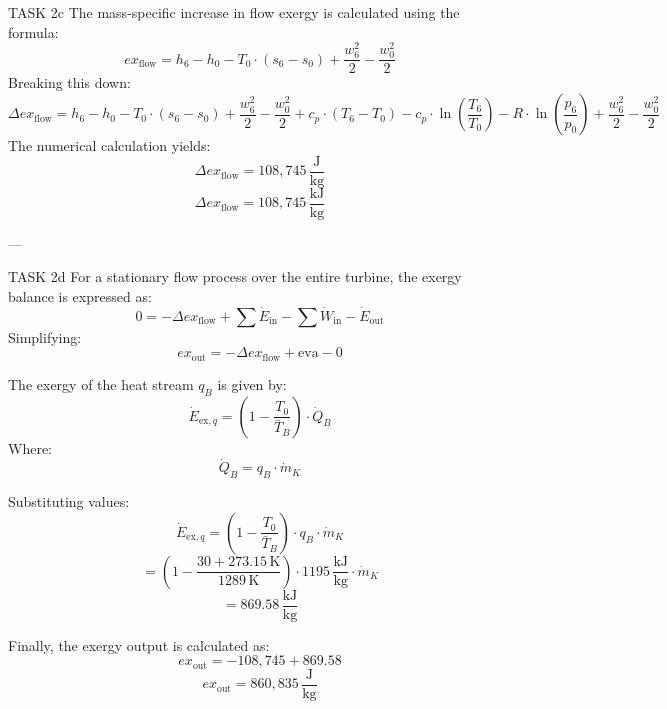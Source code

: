 TASK 2c  
The mass-specific increase in flow exergy is calculated using the formula:  
\[
ex_{\text{flow}} = h_6 - h_0 - T_0 \cdot (s_6 - s_0) + \frac{w_6^2}{2} - \frac{w_0^2}{2}
\]  
Breaking this down:  
\[
\Delta ex_{\text{flow}} = h_6 - h_0 - T_0 \cdot (s_6 - s_0) + \frac{w_6^2}{2} - \frac{w_0^2}{2} + c_p \cdot (T_6 - T_0) - c_p \cdot \ln\left(\frac{T_6}{T_0}\right) - R \cdot \ln\left(\frac{p_6}{p_0}\right) + \frac{w_6^2}{2} - \frac{w_0^2}{2}
\]  
The numerical calculation yields:  
\[
\Delta ex_{\text{flow}} = 108,745 \, \frac{\text{J}}{\text{kg}}
\]  
\[
\Delta ex_{\text{flow}} = 108,745 \, \frac{\text{kJ}}{\text{kg}}
\]  

---

TASK 2d  
For a stationary flow process over the entire turbine, the exergy balance is expressed as:  
\[
0 = -\Delta ex_{\text{flow}} + \sum \dot{E}_{\text{in}} - \sum \dot{W}_{\text{in}} - \dot{E}_{\text{out}}
\]  
Simplifying:  
\[
ex_{\text{out}} = -\Delta ex_{\text{flow}} + \text{eva} - 0
\]  

The exergy of the heat stream \( q_B \) is given by:  
\[
\dot{E}_{\text{ex},q} = \left(1 - \frac{T_0}{\bar{T}_B}\right) \cdot \dot{Q}_B
\]  
Where:  
\[
\dot{Q}_B = q_B \cdot \dot{m}_K
\]  

Substituting values:  
\[
\dot{E}_{\text{ex},q} = \left(1 - \frac{T_0}{\bar{T}_B}\right) \cdot q_B \cdot \dot{m}_K
\]  
\[
= \left(1 - \frac{30 + 273.15 \, \text{K}}{1289 \, \text{K}}\right) \cdot 1195 \, \frac{\text{kJ}}{\text{kg}} \cdot \dot{m}_K
\]  
\[
= 869.58 \, \frac{\text{kJ}}{\text{kg}}
\]  

Finally, the exergy output is calculated as:  
\[
ex_{\text{out}} = -108,745 + 869.58
\]  
\[
ex_{\text{out}} = 860,835 \, \frac{\text{J}}{\text{kg}}
\]